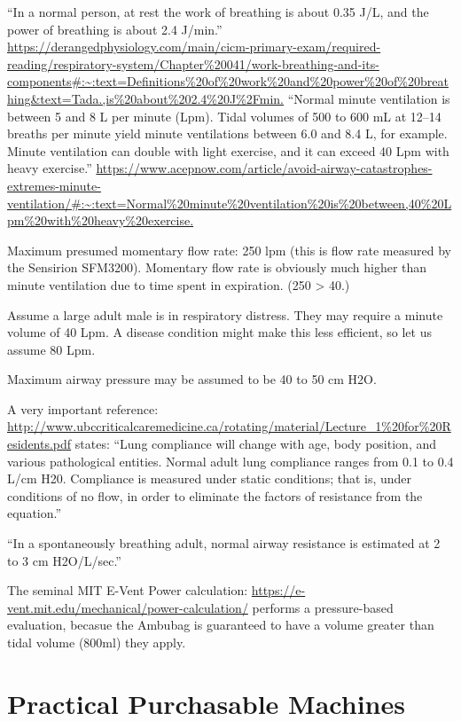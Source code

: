\documentclass{article}
\begin{document}
``In a normal person, at rest the work of breathing is about 0.35 J/L, and the power of breathing is about 2.4 J/min.''
\url{https://derangedphysiology.com/main/cicm-primary-exam/required-reading/respiratory-system/Chapter%20041/work-breathing-and-its-components#:~:text=Definitions%20of%20work%20and%20power%20of%20breathing&text=Tada.,is%20about%202.4%20J%2Fmin.}
  ``Normal minute ventilation is between 5 and 8 L per minute (Lpm). Tidal volumes of 500 to 600 mL at 12–14 breaths per minute yield minute ventilations between 6.0 and 8.4 L, for example. Minute ventilation can double with light exercise, and it can exceed 40 Lpm with heavy exercise.''
  \url{https://www.acepnow.com/article/avoid-airway-catastrophes-extremes-minute-ventilation/#:~:text=Normal%20minute%20ventilation%20is%20between,40%20Lpm%20with%20heavy%20exercise.}

    Maximum presumed momentary flow rate: 250 lpm (this is flow rate measured by the Sensirion SFM3200). Momentary flow rate is obviously much higher than minute ventilation
    due to time spent in expiration. (250 > 40.)

    Assume a large adult male is in respiratory distress. They may require a minute volume of 40 Lpm. A disease condition might make this less efficient, so let us
    assume 80 Lpm.

    Maximum airway pressure may be assumed to be 40 to 50 cm H2O.

    A very important reference:   \url{http://www.ubccriticalcaremedicine.ca/rotating/material/Lecture_1%20for%20Residents.pdf}
      states:
      ``Lung compliance will change with age, body position, and various pathological
entities. Normal adult lung compliance ranges from 0.1 to 0.4 L/cm H20. Compliance is
measured under static conditions; that is, under conditions of no flow, in order to
eliminate the factors of resistance from the equation.''

``In a spontaneously breathing adult, normal airway resistance is estimated at 2 to 3
cm H2O/L/sec.''

The seminal MIT E-Vent Power calculation: \url{https://e-vent.mit.edu/mechanical/power-calculation/} performs
a pressure-based evaluation, becasue the Ambubag is guaranteed to have a volume greater than tidal volume (800ml) they apply.

\section{Practical Purchasable Machines}
\end{document}
